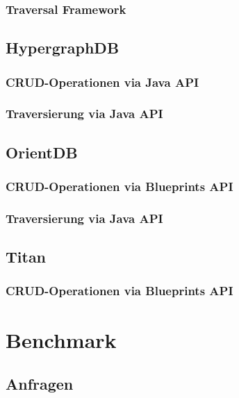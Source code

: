 \subsubsection{Traversal Framework}
\label{anh:neo4j_traversal_framework}

\subsection{HypergraphDB}

\subsubsection{CRUD-Operationen via Java API}

\subsubsection{Traversierung via Java API}

\subsection{OrientDB}

\subsubsection{CRUD-Operationen via Blueprints API}
\label{anh:orientdb_blueprints_api}

\subsubsection{Traversierung via Java API}
\label{anh:orientdb_traverse_java}

\subsection*{Titan}

\subsubsection{CRUD-Operationen via Blueprints API}
\label{anh:titan_blueprints_api}

\section{Benchmark}

\subsection{Anfragen}
\label{anh:queries}

